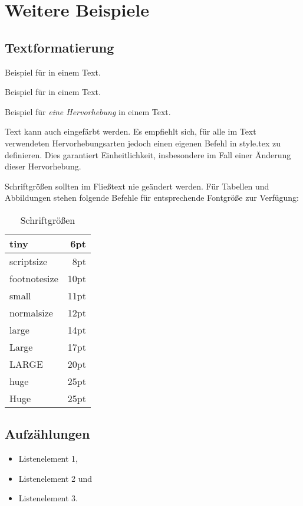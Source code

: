 \chapter{Weitere Beispiele}
\label{chp:Weitere_Beispiele}

\section{Textformatierung}
\label{sec:Textformatierung}

Beispiel für  in einem Text.

Beispiel für  in einem Text.

Beispiel für \emph{eine Hervorhebung} in einem Text.

Text kann auch {\color{red}eingefärbt} werden.
Es empfiehlt sich, für alle im Text verwendeten Hervorhebungsarten jedoch einen eigenen Befehl in style.tex zu definieren.
Dies garantiert Einheitlichkeit, insbesondere im Fall einer Änderung dieser Hervorhebung.

Schriftgrößen sollten im Fließtext nie geändert werden. Für Tabellen und Abbildungen stehen folgende Befehle für entsprechende Fontgröße zur Verfügung:

\begin{table}[ht!]
	\selectfont
	\centering
	\begin{tabular}{|l|r|}
		\hline
		tiny & 6pt \\\hline
		scriptsize & 8pt \\\hline
		footnotesize & 10pt \\\hline
		small & 11pt \\\hline
		normalsize & 12pt \\\hline
		large & 14pt \\\hline
		Large & 17pt \\\hline
		LARGE & 20pt \\\hline
		huge & 25pt \\\hline
		Huge & 25pt \\\hline
	\end{tabular}
	\caption{Schriftgrößen}
	\label{tab:fontsize}
\end{table}

\section{Aufzählungen}
\label{sec:Aufzaehlungen}

\begin{itemize}
	\item Listenelement 1,
	\item Listenelement 2 und
	\item Listenelement 3.
\end{itemize}

